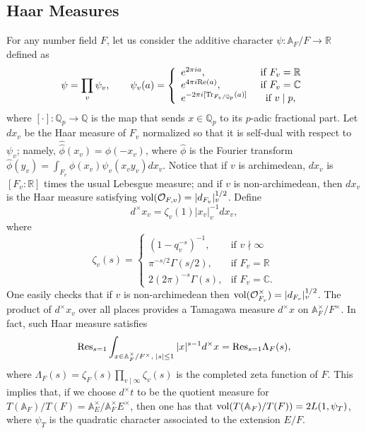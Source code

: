 \documentclass{amsart}
\theoremstyle{definition}
\theoremstyle{remark}
\numberwithin{equation}{section}
\newcommand{\A}{{\mathbb A}}
\newcommand{\Q}{{\mathbb Q}}
\newcommand{\C}{{\mathbb C}}
\newcommand{\R}{{\mathbb R}}
\newcommand{\cO}{{\mathcal O}}
\begin{document}
\subsection{Haar Measures}\label{haarmeasures}
For any number field $F$, let us consider the additive character $\psi:\A_F/F\rightarrow\R$ defined as
\begin{equation}\label{defpsiad}
    \psi=\prod_v\psi_v,\qquad  \psi_v(a)=\left\{\begin{array}{lc}
       e^{2\pi i a},  &\text{ if } F_v=\R  \\
        e^{4\pi i{\rm Re}(a)}, &\text{ if } F_v=\C\\
        e^{-2\pi i[{\rm Tr}_{F_v/\Q_p}(a)]}&\text{ if } v\mid p,
    \end{array}\right.
\end{equation}
where $[\cdot]:\Q_p \rightarrow\Q$ is the map that sends $x\in\Q_p$ to its $p$-adic fractional part.
Let $dx_v$ be the Haar measure of $F_v$ normalized so that it is self-dual with respect to $\psi_v$; namely, $\hat{\hat\phi}(x_v)=\phi(-x_v)$, where $\hat\phi$ is the Fourier transform $\hat\phi(y_v)=\int_{F_v}\phi(x_v)\psi_v(x_vy_v)dx_v$.
Notice that if $v$ is archimedean, $dx_v$ is $[F_v:\R]$ times the usual Lebesgue measure; and if $v$ is non-archimedean, then $dx_v$ is the Haar measure satisfying ${\rm vol}(\cO_{F,v})=|d_{F_v}|_v^{1/2}$. Define $$d^\times x_v=\zeta_v(1)|x_v|_v^{-1}dx_v,$$
where 
$$
\zeta_v(s)=\begin{cases}
			(1-q_v^{-s})^{-1}, & \text{if $v\nmid\infty$}\\
         \pi^{-s/2}\Gamma(s/2)   , & \text{if $F_v=\R$}\\
         2(2\pi)^{-s}\Gamma(s), & \text{if $F_v=\C$}.
		 \end{cases}
$$
One easily checks that if $v$ is non-archimedean then ${\rm vol}(\cO_{F_v}^\times)=|d_{F_v}|_v^{1/2}$. The product of $d^\times x_v$ over all places provides a Tamagawa measure $d^\times x$ on $\A_F^\times/F^\times$. In fact, such Haar measure satisfies
\[
{\rm Res}_{s=1}\int_{x\in\A_F^\times/F^\times,\;|s|\leq 1}|x|^{s-1}d^\times x={\rm Res}_{s=1}\Lambda_F(s),
\]
where $\Lambda_F(s)=\zeta_F(s)\prod_{v\mid\infty}\zeta_{v}(s)$ is the completed zeta function of $F$. This implies that, if we choose $d^\times t$ to be the quotient measure for $T(\A_F)/T(F)=\A_E^\times/\A_F^\times E^\times$, then one has that ${\rm vol}(T(\A_F)/T(F))=2L(1,\psi_T)$, where $\psi_T$ is the quadratic character associated to the extension $E/F$.
\end{document}
